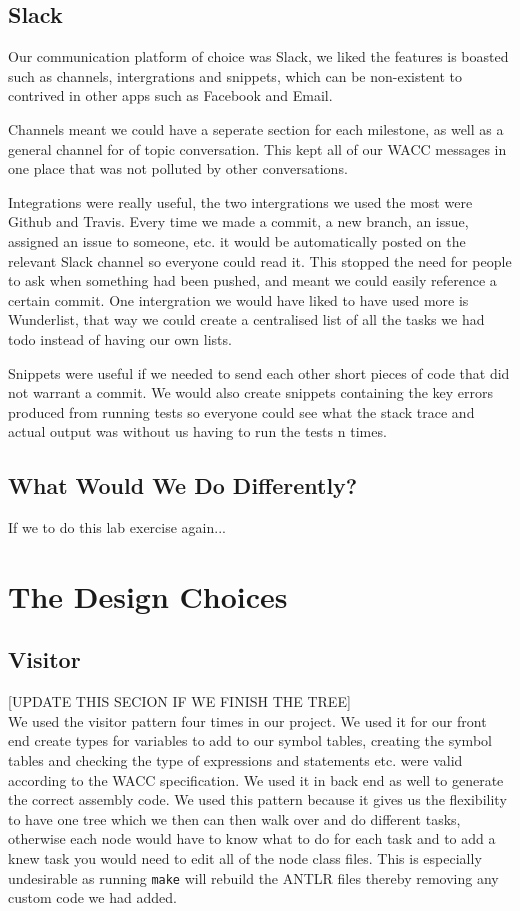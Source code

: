 \documentclass[11pt,a4paper]{article}
\begin{document}
\subsection{Slack}
\label{sub:Slack}
Our communication platform of choice was Slack, we liked the features is boasted such as channels, intergrations and snippets, which can be non-existent to contrived in other apps such as Facebook and Email.

Channels meant we could have a seperate section for each milestone, as well as a general channel for of topic conversation. This kept all of our WACC messages in one place that was not polluted by other conversations.

Integrations were really useful, the two intergrations we used the most were Github and Travis. Every time we made a commit, a new branch, an issue, assigned an issue to someone, etc. it would be automatically posted on the relevant Slack channel so everyone could read it. This stopped the need for people to ask when something had been pushed, and meant we could easily reference a certain commit. One intergration we would have liked to have used more is Wunderlist, that way we could create a centralised list of all the tasks we had todo instead of having our own lists.

Snippets were useful if we needed to send each other short pieces of code that did not warrant a commit. We would also create snippets containing the key errors produced from running tests so everyone could see what the stack trace and actual output was without us having to run the tests n times.

\subsection{What Would We Do Differently?}
\label{sub:What Would We Do Differently?}

If we to do this lab exercise again...

\section{The Design Choices}
\label{sec:The Design Choices}

\subsection{Visitor}
\label{sub:Visitor}
[UPDATE THIS SECION IF WE FINISH THE TREE]\\
We used the visitor pattern four times in our project. We used it for our front end create types for variables to add to our symbol tables, creating the symbol tables and checking the type of expressions and statements etc. were valid according to the WACC specification. We used it in back end as well to generate the correct assembly code. We used this pattern because it gives us the flexibility to have one tree which we then can then walk over and do different tasks, otherwise each node would have to know what to do for each task and to add a knew task you would need to edit all of the node class files. This is especially undesirable as running \texttt{make} will rebuild the ANTLR files thereby removing any custom code we had added.
\end{document}
